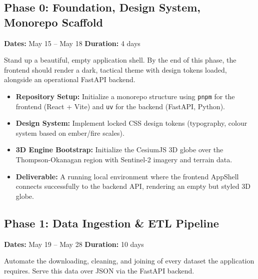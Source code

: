 \documentclass[12pt,letterpaper]{article}
\begin{document}
\subsection*{Phase 0: Foundation, Design System, Monorepo Scaffold}
\textbf{Dates:} May 15 -- May 18 \hfill \textbf{Duration:} 4 days

\begin{goalbox}
Stand up a beautiful, empty application shell. By the end of this phase, the frontend should render a dark, tactical theme with design tokens loaded, alongside an operational FastAPI backend.
\end{goalbox}

\begin{itemize}
    \item \textbf{Repository Setup:} Initialize a monorepo structure using \texttt{pnpm} for the frontend (React + Vite) and \texttt{uv} for the backend (FastAPI, Python).
    \item \textbf{Design System:} Implement locked CSS design tokens (typography, colour system based on ember/fire scales).
    \item \textbf{3D Engine Bootstrap:} Initialize the CesiumJS 3D globe over the Thompson-Okanagan region with Sentinel-2 imagery and terrain data.
    \item \textbf{Deliverable:} A running local environment where the frontend AppShell connects successfully to the backend API, rendering an empty but styled 3D globe.
\end{itemize}

\subsection*{Phase 1: Data Ingestion \& ETL Pipeline}
\textbf{Dates:} May 19 -- May 28 \hfill \textbf{Duration:} 10 days

\begin{goalbox}
Automate the downloading, cleaning, and joining of every dataset the application requires. Serve this data over JSON via the FastAPI backend.
\end{goalbox}
\end{document}
